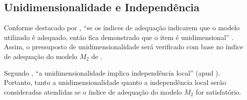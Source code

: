 \begin{comment}
(buscar referencias)

Além disso, foram = avaliado o Akaike Information Criterion (AIC), criado por Akaike (1974) e o Deviance Information Criterion (DIC). Segundo esses critérios, o modelo com o menor valores de AIC e DIC se ajustam melhor aos dados \cite{raftery2006}.


\begin{table}[!htb]
	\IBGEtab{%
		\caption{Classificação da questão de acordo com parâmetro de dificuldade.}
		\label{tabela-class-b}
	}{%
		\begin{tabular}{ccc}
			\toprule
		Intervalo de Dificuldade \\ Escala ENEM &	Classificação & Distribuição Esperada   \\ 
			\midrule \midrule
			Até 372 & Muito Fácil & 10\%   \\ 
			\midrule
			Entre a e c & Fácil & 20\%   \\ 
			\midrule
			Entre a e c & Mediano & 40\%   \\ 
						\midrule
			Entre a e c & Difícil & 20\%   \\ 
						\midrule
			Entre a e c & Muito Difícil & 10\%   \\ 
			\bottomrule
		\end{tabular}
	}{%
		\fonte{\citeonline{rabelo2013}, p.134}
	}
\end{table}


\end{comment}


\subsection{Unidimensionalidade e Independência}

Conforme destacado por ,  ``se os índices de adequação indicarem que o modelo utilizado é adequado, então fica demonstrado que o item é unidimensional'' . Assim, o pressuposto de unidimensionalidade será verificado com base no índice de adequação do modelo $M_2$ de . 


Segundo , ``a unidimensionalidade implica independência local'' (apud \cite{hambleton1991}). Portanto, tanto a unidimensionalidade quanto a independência local serão consideradas atendidas se o índice de adequação do modelo $M_2$ for satisfatório.

